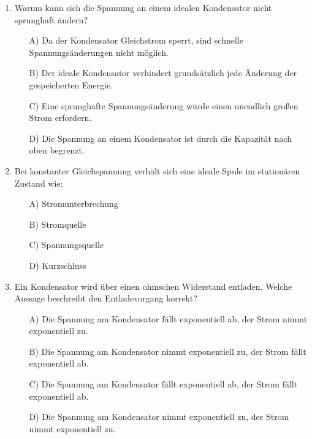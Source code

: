 \documentclass[a4paper,12pt]{article}
\newif\ifshowsolutions
\begin{document}
\begin{enumerate}[label=\textbf{\arabic*.}, leftmargin=*, itemsep=8pt]
\ifshowsolutions
Lösung: A
\fi

  \item Warum kann sich die Spannung an einem idealen Kondensator nicht sprunghaft ändern?
    \begin{itemize}[label=$\square$]
      \item[A)] Da der Kondensator Gleichstrom sperrt, sind schnelle Spannungsänderungen nicht möglich.
      \item[B)] Der ideale Kondensator verhindert grundsätzlich jede Änderung der gespeicherten Energie.
      \item[C)] Eine sprunghafte Spannungsänderung würde einen unendlich großen Strom erfordern.
      \item[D)] Die Spannung an einem Kondensator ist durch die Kapazität nach oben begrenzt.
    \end{itemize}

\ifshowsolutions
Lösung: C
\fi

  \item Bei konstanter Gleichspannung verhält sich eine ideale Spule im stationären Zustand wie:
    \begin{itemize}[label=$\square$]
      \item[A)] Stromunterbrechung
      \item[B)] Stromquelle
      \item[C)] Spannungsquelle
      \item[D)] Kurzschluss
    \end{itemize}

\ifshowsolutions
Lösung: D
\fi

  \item Ein Kondensator wird über einen ohmschen Widerstand entladen. Welche Aussage beschreibt den Entladevorgang korrekt?
    \begin{itemize}[label=$\square$]
      \item[A)] Die Spannung am Kondensator fällt exponentiell ab, der Strom nimmt exponentiell zu.
      \item[B)] Die Spannung am Kondensator nimmt exponentiell zu, der Strom fällt exponentiell ab.
      \item[C)] Die Spannung am Kondensator fällt exponentiell ab, der Strom fällt exponentiell ab.
      \item[D)] Die Spannung am Kondensator nimmt exponentiell zu, der Strom nimmt exponentiell zu.
    \end{itemize}

\ifshowsolutions
Lösung: C
\fi


\end{enumerate}
\end{document}
